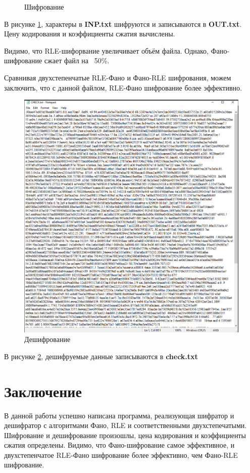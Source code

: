 \documentclass[12pt]{article} %
\begin{document}
\begin{figure}[H]
\begin{subfigure}
\end{subfigure}
\caption{Шифрование} \label{code}
\end{figure}
В рисунке \ref{code}, характеры в \textbf{INP.txt} шифруются и записываются в \textbf{OUT.txt}. Цену кодирования и коэффициенты сжатия вычислены. 

Видимо, что RLE-шифорвание увеличивает объём файла. Однако, Фано-шифрование сжает файл на ~50\%. 

Сравнивая двухстепенчатые RLE-Фано и Фано-RLE шифрования, можем заключить, что с данной файлом, RLE-Фано шифрование более эффективно.

\begin{figure}[H]
\includegraphics[scale = 0.5]{check.png}
\caption{Дешифрование} \label{decode}
\end{figure}
В рисунке \ref{decode}, дешифруемые данные записываются в \textbf{check.txt}


\newpage
	\section*{Заключение}
	 В данной работы успешно написана программа, реализующая шифратор и дешифратор с алгоритмами Фано, RLE и соответственными двухстепечатыми. Шифрование и дешифрование произошлы, цена кодирования и коэффициенты сжатия определены. Видимо, что Фано-шифрование самое эффективное, и двухстепенчатое RLE-Фано шифрование более эффективно, чем Фано-RLE шифрование. 
	
\end{document}
